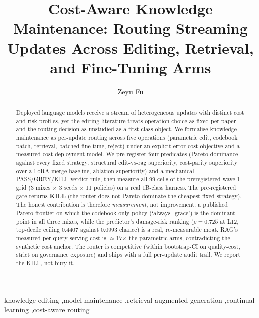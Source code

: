 \documentclass[preprint,12pt]{elsarticle}
\newcommand{\todoslot}[1]{\textcolor{red}{[#1]}}
\begin{document}
\begin{frontmatter}

\title{Cost-Aware Knowledge Maintenance: Routing Streaming Updates
Across Editing, Retrieval, and Fine-Tuning Arms}

\author[1]{Zeyu Fu}
\affiliation[1]{organization={\todoslot{affiliation}}, country={\todoslot{country}}}
\ead{[email]}

\begin{abstract}
Deployed language models receive a stream of heterogeneous updates with distinct
cost and risk profiles, yet the editing literature treats operation choice as fixed
per paper and the routing decision as unstudied as a first-class object. We
formalise knowledge maintenance as per-update routing across five operations
(parametric edit, codebook patch, retrieval, batched fine-tune, reject) under an
explicit error-cost objective and a measured-cost deployment model. We
pre-register four predicates (Pareto dominance against every fixed strategy,
structural edit-vs-rag superiority, cost-parity superiority over a
LoRA-merge baseline, ablation superiority) and a mechanical PASS/GREY/KILL
verdict rule, then measure all 99 cells of the preregistered wave-1 grid
(3 mixes $\times$ 3 seeds $\times$ 11 policies) on a real 1B-class harness.
The pre-registered gate returns \textbf{KILL} (the router does not
Pareto-dominate the cheapest fixed strategy). The honest contribution is
therefore \emph{measurement}, not improvement: a published Pareto frontier on
which the codebook-only policy (`always\_grace') is the dominant point in all
three mixes, while the predictor's damage-risk ranking ($\rho = 0.725$ at L12,
top-decile ceiling 0.4407 against 0.0993 chance) is a real, re-measurable
moat. RAG's measured per-query serving cost is $\approx$17$\times$ the
parametric arms, contradicting the synthetic cost anchor. The router is
competitive (within bootstrap-CI on quality-cost, strict on governance
exposure) and ships with a full per-update audit trail. We report the KILL,
not bury it.
\end{abstract}

\begin{keyword}
knowledge editing \sep model maintenance \sep retrieval-augmented generation
\sep continual learning \sep cost-aware routing
\end{keyword}

\end{frontmatter}

\end{document}
